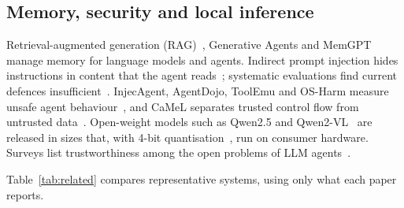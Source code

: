 \subsection{Memory, security and local inference}
Retrieval-augmented generation (RAG)~\cite{lewis2020rag,reimers2019sbert}, Generative Agents and MemGPT~\cite{park2023generative,packer2023memgpt} manage memory for language models and agents. Indirect prompt injection hides instructions in content that the agent reads~\cite{greshake2023indirect}; systematic evaluations find current defences insufficient~\cite{liu2024formalizing}. InjecAgent, AgentDojo, ToolEmu and OS-Harm measure unsafe agent behaviour~\cite{zhan2024injecagent,debenedetti2024agentdojo,ruan2024toolemu,kuntz2025osharm}, and CaMeL separates trusted control flow from untrusted data~\cite{debenedetti2025camel}. Open-weight models such as Qwen2.5 and Qwen2-VL~\cite{yang2024qwen25,wang2024qwen2vl} are released in sizes that, with 4-bit quantisation~\cite{lin2024awq}, run on consumer hardware. Surveys list trustworthiness among the open problems of LLM agents~\cite{wang2024survey,xi2025rise}.

Table~\ref{tab:related} compares representative systems, using only what each paper reports.

